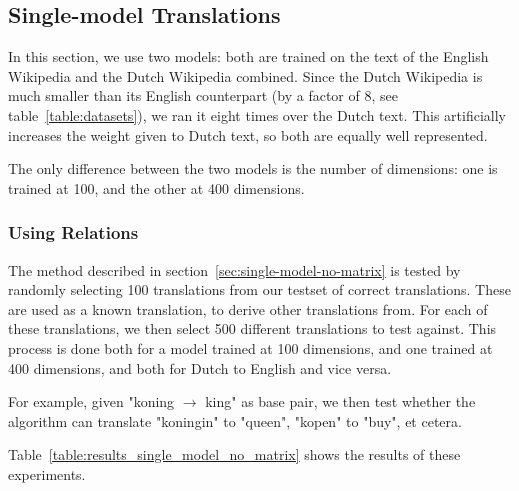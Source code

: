 \subsection{Single-model Translations}
In this section, we use two models: both are trained on the text of the English Wikipedia and the Dutch Wikipedia combined. Since the Dutch Wikipedia is much smaller than its English counterpart (by a factor of 8, see table~\ref{table:datasets}), we ran it eight times over the Dutch text. This artificially increases the weight given to Dutch text, so both are equally well represented.

The only difference between the two models is the number of dimensions: one is trained at 100, and the other at 400 dimensions.

\subsubsection{Using Relations}
The method described in section~\ref{sec:single-model-no-matrix} is tested by randomly selecting 100 translations from our testset of correct translations. These are used as a known translation, to derive other translations from. For each of these translations, we then select 500 different translations to test against. This process is done both for a model trained at 100 dimensions, and one trained at 400 dimensions, and both for Dutch to English and vice versa.

For example, given "koning $\to$ king" as base pair, we then test whether the algorithm can translate "koningin" to "queen", "kopen" to "buy", et cetera.

Table~\ref{table:results_single_model_no_matrix} shows the results of these experiments.

